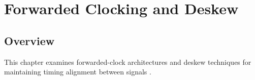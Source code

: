 \chapter{Forwarded Clocking and Deskew}

\section{Overview}

This chapter examines forwarded-clock architectures and deskew
techniques for maintaining timing alignment between signals
\citep{palermo2025ecen720}.





